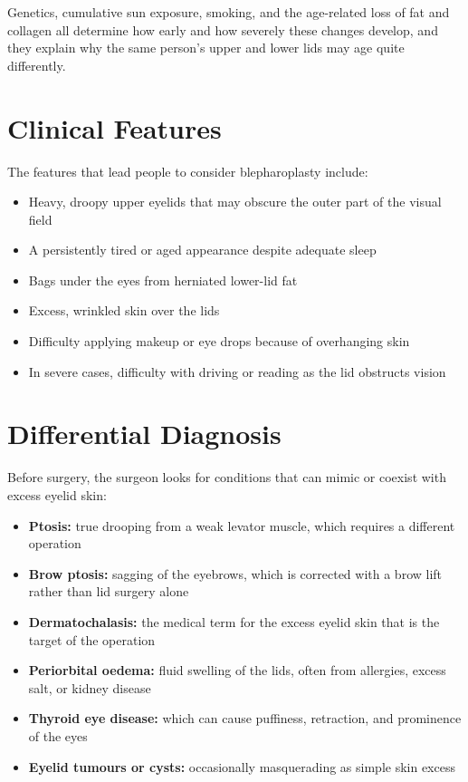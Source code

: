 Genetics, cumulative sun exposure, smoking, and the age-related loss of fat and collagen all determine how early and how severely these changes develop, and they explain why the same person's upper and lower lids may age quite differently.

\section*{Clinical Features}
The features that lead people to consider blepharoplasty include:

\begin{itemize}
    \item Heavy, droopy upper eyelids that may obscure the outer part of the visual field
    \item A persistently tired or aged appearance despite adequate sleep
    \item Bags under the eyes from herniated lower-lid fat
    \item Excess, wrinkled skin over the lids
    \item Difficulty applying makeup or eye drops because of overhanging skin
    \item In severe cases, difficulty with driving or reading as the lid obstructs vision
\end{itemize}

\section*{Differential Diagnosis}
Before surgery, the surgeon looks for conditions that can mimic or coexist with excess eyelid skin:

\begin{itemize}
    \item \textbf{Ptosis:} true drooping from a weak levator muscle, which requires a different operation
    \item \textbf{Brow ptosis:} sagging of the eyebrows, which is corrected with a brow lift rather than lid surgery alone
    \item \textbf{Dermatochalasis:} the medical term for the excess eyelid skin that is the target of the operation
    \item \textbf{Periorbital oedema:} fluid swelling of the lids, often from allergies, excess salt, or kidney disease
    \item \textbf{Thyroid eye disease:} which can cause puffiness, retraction, and prominence of the eyes
    \item \textbf{Eyelid tumours or cysts:} occasionally masquerading as simple skin excess
\end{itemize}

